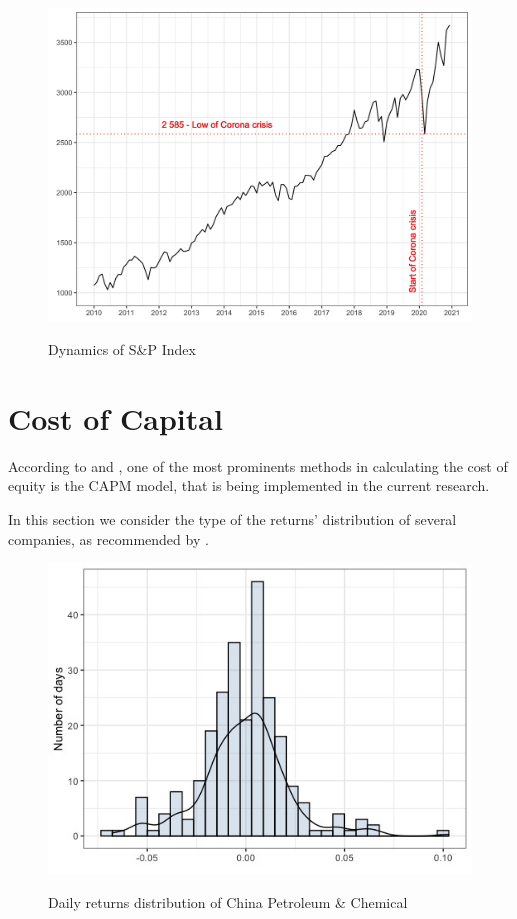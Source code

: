 \documentclass [a4paper, 11pt] {article}
\begin{document}
\begin{figure}[h]
\caption{Dynamics of S\&P Index}
\includegraphics[scale=0.17]{sandp}
\label{fig:sandp}
\end{figure}


\clearpage
\section {Cost of Capital}
According to \cite{DamodaranDark} and \cite{BestPract}, one of the most prominents methods in calculating the cost of equity is the CAPM model, that is being implemented in the current research.

In this section we consider the type of the returns' distribution of several companies, as recommended by \cite{Fishman}.

\begin{figure}[h]
\caption{Daily returns distribution of China Petroleum \& Chemical}
\includegraphics[scale=0.65]{snp_hist}
\label{fig:hist1}
\end{figure}
\end{document}
